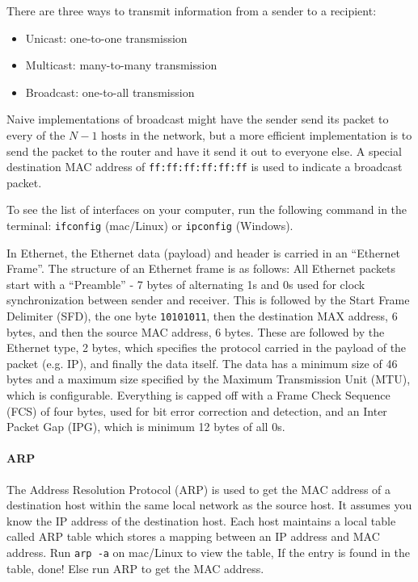 There are three ways to transmit information from a sender to a
recipient:
\begin{itemize}
    \item Unicast: one-to-one transmission
    \item Multicast: many-to-many transmission
    \item Broadcast: one-to-all transmission
\end{itemize}

Naive implementations of
broadcast might have the sender send its packet to every of the
$N-1$ hosts in the network, but a more efficient implementation
is to send the packet to the router and have it send it out
to everyone else.
A special destination MAC address of \texttt{ff:ff:ff:ff:ff:ff} is used
to indicate a broadcast packet.

To see the list of interfaces on your computer, run the following
command in the terminal: \texttt{ifconfig} (mac/Linux) or
\texttt{ipconfig} (Windows).

In Ethernet, the Ethernet data (payload) and header is carried in an “Ethernet Frame”.
The structure of an Ethernet frame is as follows:
All Ethernet packets start with a “Preamble” - 7 bytes of alternating 1s and 0s
used for clock synchronization between sender and receiver.
This is followed by the Start Frame Delimiter (SFD), the one byte
\texttt{10101011}, then the destination MAX address, 6 bytes, and
then the source MAC address, 6 bytes. These are followed by the
Ethernet type, 2 bytes, which specifies the protocol carried in
the payload of the packet (e.g. IP), and finally the data itself.
The data has a minimum size of 46 bytes and a maximum size specified
by the Maximum Transmission Unit (MTU), which is configurable.
Everything is capped off with a Frame Check Sequence (FCS) of
four bytes, used for bit error correction and detection, and an
Inter Packet Gap (IPG), which is minimum 12 bytes of all 0s.

\paragraph{ARP}

The Address Resolution Protocol (ARP) is used to get the MAC
address of a destination host
within the same local network as the source host. It
assumes you know the IP address of the destination host.
Each host maintains a local table called ARP table
which stores a mapping between an IP address and MAC address.
Run \texttt{arp -a} on mac/Linux to view the table,
If the entry is found in the table, done!
Else run ARP to get the MAC address.

